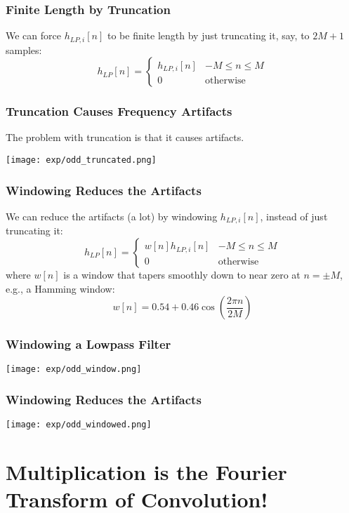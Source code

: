 \documentclass{beamer}
\begin{document}
\begin{frame}
  \frametitle{Finite Length by Truncation}

  We can force $h_{LP,i}[n]$ to be finite length by just truncating it,
  say, to $2M+1$ samples:
  \[
  h_{LP}[n] = \begin{cases}
    h_{LP,i}[n] & -M\le n\le M\\
    0 &\mbox{otherwise}
  \end{cases}
  \]
\end{frame}

\begin{frame}
  \frametitle{Truncation Causes Frequency Artifacts}

  The problem with truncation is that it causes artifacts.

  \centerline{\texttt{[image: exp/odd\_truncated.png]}}
\end{frame}


\begin{frame}
  \frametitle{Windowing Reduces the Artifacts}

  We can reduce the artifacts (a lot) by
  windowing $h_{LP,i}[n]$, instead of just truncating it:
  \[
  h_{LP}[n] = \begin{cases}
    w[n]h_{LP,i}[n] & -M\le n\le M\\
    0 &\mbox{otherwise}
  \end{cases}
  \]
  where $w[n]$ is a window that tapers smoothly down to near zero at
  $n=\pm M$, e.g., a Hamming window:
  \[
  w[n] = 0.54 + 0.46 \cos\left(\frac{2\pi n}{2M}\right)
  \]
\end{frame}

\begin{frame}
  \frametitle{Windowing a Lowpass Filter}
  \centerline{\texttt{[image: exp/odd\_window.png]}}
\end{frame}

\begin{frame}
  \frametitle{Windowing Reduces the Artifacts}

  \centerline{\texttt{[image: exp/odd\_windowed.png]}}
\end{frame}

\section[Windowing]{Multiplication is the Fourier Transform of Convolution!}
\setcounter{subsection}{1}
\end{document}
